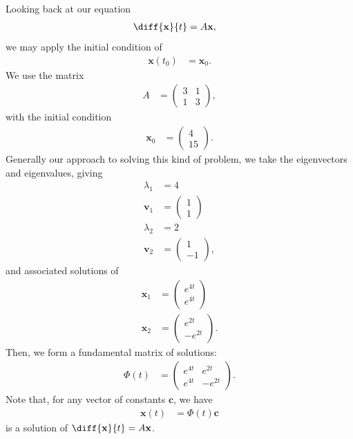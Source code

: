 \documentclass[10pt]{mypackage}
\begin{document}
\begin{example}
  Looking back at our equation
  \begin{align*}
    \diff{\mathbf{x}}{t} &= A\mathbf{x},
  \end{align*}
  we may apply the initial condition of
  \begin{align*}
    \mathbf{x}\left( t_0 \right) &= \mathbf{x}_0.
  \end{align*}
  We use the matrix
  \begin{align*}
    A &= \begin{pmatrix}3 & 1 \\ 1 & 3\end{pmatrix},
  \end{align*}
  with the initial condition
  \begin{align*}
    \mathbf{x}_0 &= \begin{pmatrix}4\\15\end{pmatrix}.
  \end{align*}
  Generally our approach to solving this kind of problem, we take the eigenvectors and eigenvalues, giving
  \begin{align*}
    \lambda_1 &= 4\\
    \mathbf{v}_1 &= \begin{pmatrix}1\\1\end{pmatrix}\\
    \lambda_2 &= 2\\
    \mathbf{v}_2 &= \begin{pmatrix}1\\-1\end{pmatrix},
  \end{align*}
  and associated solutions of
  \begin{align*}
    \mathbf{x}_1 &= \begin{pmatrix}e^{4t}\\e^{4t}\end{pmatrix}\\
    \mathbf{x}_2 &= \begin{pmatrix}e^{2t} \\ -e^{2t}\end{pmatrix}.
  \end{align*}
  Then, we form a fundamental matrix of solutions:
  \begin{align*}
    \Phi(t) &= \begin{pmatrix}e^{4t} & e^{2t} \\ e^{4t} & -e^{2t}\end{pmatrix}.
  \end{align*}
  Note that, for any vector of constants $\mathbf{c}$, we have
  \begin{align*}
    \mathbf{x}(t) &= \Phi(t)\mathbf{c}
  \end{align*}
  is a solution of $\diff{\mathbf{x}}{t} = A\mathbf{x}$.\newline


\end{example}
\end{document}
